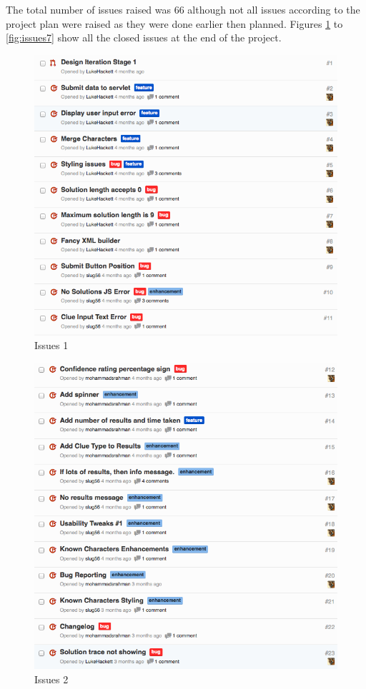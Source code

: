 The total number of issues raised was 66 although not all issues according to
the project plan were raised as they were done earlier then planned. Figures
\ref{fig:issues1} to \ref{fig:issues7} show all the closed issues at the end of
the project.

\begin{figure}[H]
  \centering
  \includegraphics[width=\linewidth]{images/issues1.png}
  \caption{Issues 1}
  \label{fig:issues1}
\end{figure}

\begin{figure}[H]
  \centering
  \includegraphics[width=\linewidth]{images/issues2.png}
  \caption{Issues 2}
  \label{fig:issues2}
\end{figure}

